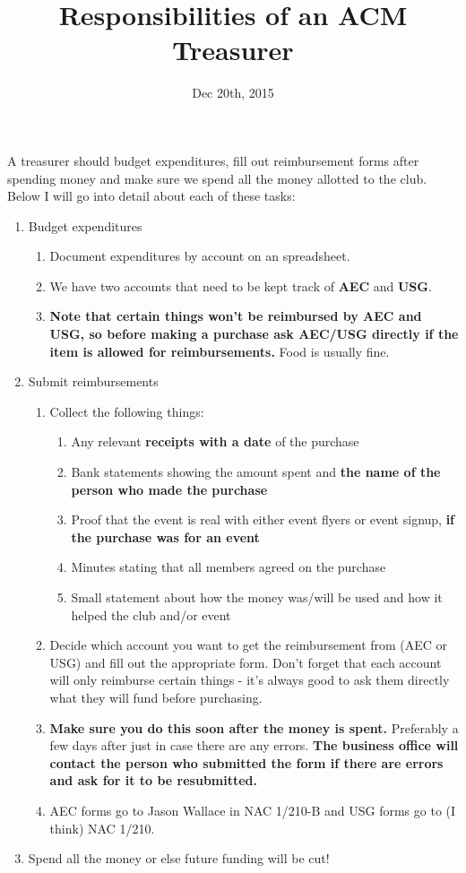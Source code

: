 \documentclass{article}
\begin{document}
\title{Responsibilities of an ACM Treasurer}
\date{Dec 20th, 2015}
\maketitle

\begin{flushleft}
A treasurer should budget expenditures, fill out reimbursement forms after spending money and make sure we spend all the money allotted to the club. Below I will go into detail about each of these tasks: 
\end{flushleft}

\begin{enumerate}
	\item Budget expenditures
	\begin{enumerate}
		\item Document expenditures by account on an spreadsheet. 
		\item We have two accounts that need to be kept track of \textbf{AEC} and \textbf{USG}.
		\item \textbf{Note that certain things won't be reimbursed by AEC and USG, so before making a purchase ask AEC/USG directly if the item is allowed for reimbursements.} Food is usually fine. 
	\end{enumerate}
	\item Submit reimbursements
	\begin{enumerate}
		\item Collect the following things:
		\begin{enumerate}  
			\item Any relevant \textbf{receipts with a date} of the purchase
			\item Bank statements showing the amount spent and \textbf{the name of the person who made the purchase} 
			\item Proof that the event is real with either event flyers or event signup, \textbf{if the purchase was for an event}
			\item Minutes stating that all members agreed on the purchase
			\item Small statement about how the money was/will be used and how it helped the club and/or event
		\end{enumerate}
		\item Decide which account you want to get the reimbursement from (AEC or USG) and fill out the appropriate form. Don't forget that each account will only reimburse certain things - it's always good to ask them directly what they will fund before purchasing.
		\item \textbf{Make sure you do this soon after the money is spent.} Preferably a few days after just in case there are any errors. \textbf{The business office will contact the person who submitted the form if there are errors and ask for it to be resubmitted.}
		\item AEC forms go to Jason Wallace in NAC 1/210-B and USG forms go to (I think) NAC 1/210.  
	\end{enumerate}
	\item Spend all the money or else future funding will be cut!
	
\end{enumerate}
\end{document}
